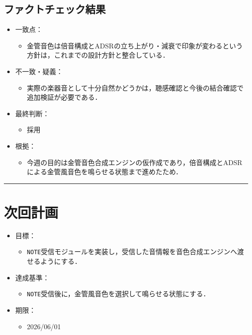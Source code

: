 \documentclass[uplatex,dvipdfmx,a4paper,11pt]{jsarticle}
\newcommand{\sectionrule}{\par\medskip\noindent\rule{\linewidth}{0.6pt}\par\medskip}
\begin{document}
\subsection{ファクトチェック結果}

\begin{itemize}
  \item 一致点：
    \begin{itemize}
      \item 金管音色は倍音構成とADSRの立ち上がり・減衰で印象が変わるという方針は，これまでの設計方針と整合している．
    \end{itemize}
  \item 不一致・疑義：
    \begin{itemize}
      \item 実際の楽器音として十分自然かどうかは，聴感確認と今後の結合確認で追加検証が必要である．
    \end{itemize}
  \item 最終判断：
    \begin{itemize}
      \item 採用
    \end{itemize}
  \item 根拠：
    \begin{itemize}
      \item 今週の目的は金管音色合成エンジンの仮作成であり，倍音構成とADSRによる金管風音色を鳴らせる状態まで進めたため．
    \end{itemize}
\end{itemize}

\sectionrule

\section{次回計画}

\begin{itemize}
  \item 目標：
    \begin{itemize}
      \item \texttt{NOTE}受信モジュールを実装し，受信した音情報を音色合成エンジンへ渡せるようにする．
    \end{itemize}
  \item 達成基準：
    \begin{itemize}
      \item \texttt{NOTE}受信後に，金管風音色を選択して鳴らせる状態にする．
    \end{itemize}
  \item 期限：
    \begin{itemize}
      \item 2026/06/01
    \end{itemize}
\end{itemize}
\end{document}
